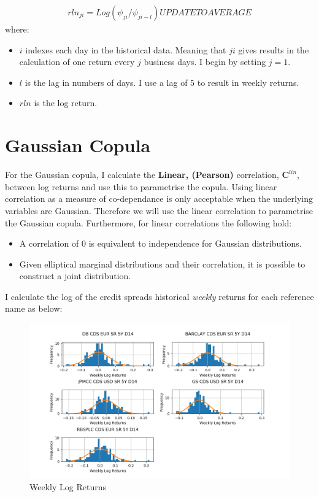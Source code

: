 \documentclass{report}
\theoremstyle{plain}
\theoremstyle{definition}
\begin{document}
\begin{align*}
rln_{ji} = Log(\psi_{ji} / \psi_{ji - l}) UPDATE TO AVERAGE
\end{align*}
where:
\begin{itemize}
	\item $i$ indexes each day in the historical data. Meaning that $ji$ gives results in the calculation of one return every $j$ business days. I begin by setting $j = 1$.
	\item $l$ is the lag in numbers of days. I use a lag of 5 to result in weekly returns.
	\item $rln$ is the log return.
\end{itemize}

\section{Gaussian Copula}

For the Gaussian copula, I calculate the \textbf{Linear, (Pearson)} correlation, $\mathbf{C}^{lin}$, between log returns and use this to parametrise the copula. Using linear correlation as a measure of co-dependance is only acceptable when the underlying variables are Gaussian. Therefore we will use the linear correlation to parametrise the Gaussian copula. Furthermore, for linear correlations the following hold:

\begin{itemize}
	\item A correlation of 0 is equivalent to independence for Gaussian distributions.
	\item Given elliptical marginal distributions and their correlation, it is possible to construct a joint distribution.
\end{itemize}

I calculate the log of the credit spreads historical \emph{weekly} returns for each reference name as below:

\begin{figure}[H]
	\begin{center}
		\includegraphics[width=15cm]{Weekly_log_returns.png}
		\caption{Weekly Log Returns} 
		\label{Weekly_log_returns}
	\end{center}
\end{figure}
\end{document}
